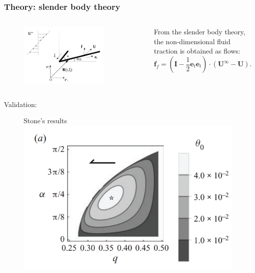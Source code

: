 \documentclass{beamer}
\begin{document}
\begin{frame}
	\frametitle{Theory: slender body theory}
	\begin{overlayarea}{\textwidth}{\textheight}
		\vspace{-1cm}
		\begin{columns}
			\begin{figure}[htb]
				\begin{center}
					\includegraphics[width=0.8\textwidth]{plots/rigid_particle7.png}
				\end{center}
			\end{figure}\vspace{0.3cm}
			\small From the slender body theory, the non-dimensional fluid traction is obtained as flows:
			\begin{equation*}
				\mathbf{f}_f=\left(\mathbf{I}-\frac{1}{2}\mathbf{e}_t\mathbf{e}_t\right)\cdot(\mathbf{U}^{\infty}-\mathbf{U}).
			\end{equation*}
		\end{columns}\vspace{-0.5cm}
	Validation: \vspace{-0.4cm}
		\begin{figure}
		\begin{minipage}{0.46\linewidth}
			\footnotesize Stone's results
			\centering			\includegraphics[width=\linewidth]{plots/plot10.png}

\end{minipage}
\end{figure}
\end{overlayarea}
\end{frame}
\end{document}
